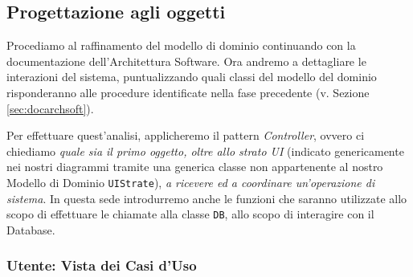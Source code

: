 \subsection{Progettazione agli oggetti}\label{subsec:projagliobj}
Procediamo al raffinamento del modello di dominio continuando con la documentazione
dell'Architettura Software. Ora andremo a dettagliare le interazioni del sistema,
puntualizzando quali classi del modello del dominio risponderanno
alle procedure identificate nella fase precedente (v. Sezione 
\vref{sec:docarchsoft}).

Per effettuare quest'analisi, applicheremo il pattern \textit{Controller}, ovvero
ci chiediamo \textit{quale sia il primo oggetto, oltre allo strato UI} (indicato
genericamente nei nostri diagrammi tramite una generica classe non appartenente
al nostro Modello di Dominio \texttt{UIStrate}), \textit{a ricevere ed a coordinare un'operazione
di sistema}. In questa sede introdurremo anche le funzioni che saranno 
utilizzate allo scopo di effettuare le chiamate alla classe \texttt{DB}, allo scopo 
di interagire con il Database.
\subsubsection{Utente: Vista dei Casi d'Uso}


